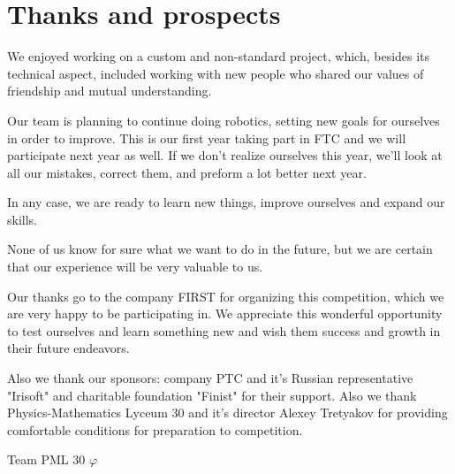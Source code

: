 
\section{Thanks and prospects} 
We enjoyed working on a custom and non-standard project, which, besides its technical aspect, included working with new people who shared our values of friendship and mutual understanding. 

Our team is planning to continue doing robotics, setting new goals for ourselves in order to improve. This is our first year taking part in FTC and we will participate next year as well. If we don't realize ourselves this year, we'll look at all our mistakes, correct them, and preform a lot better next year.

In any case, we are ready to learn new things, improve ourselves and expand our skills. 

None of us know for sure what we want to do in the future, but we are certain that our experience will be very valuable to us. 

Our thanks go to the company FIRST for organizing this competition, which we are very happy to be participating in. We appreciate this wonderful opportunity to test ourselves and learn something new and wish them success and growth in their future endeavors.

Also we thank our sponsors: company PTC and it's Russian representative "Irisoft" and charitable foundation "Finist" for their support. Also we thank Physics-Mathematics Lyceum 30 and it's director Alexey Tretyakov for providing comfortable conditions for preparation to competition.


\begin{center}
	Team PML 30 ${\varphi}$
\end{center}

\vspace{0.5em}

\begin{figure}[H]
	\begin{minipage}[h]{0.47\linewidth}
	\end{minipage}
	\hfill
	\begin{minipage}[h]{0.47\linewidth}
	\end{minipage}
\end{figure}


